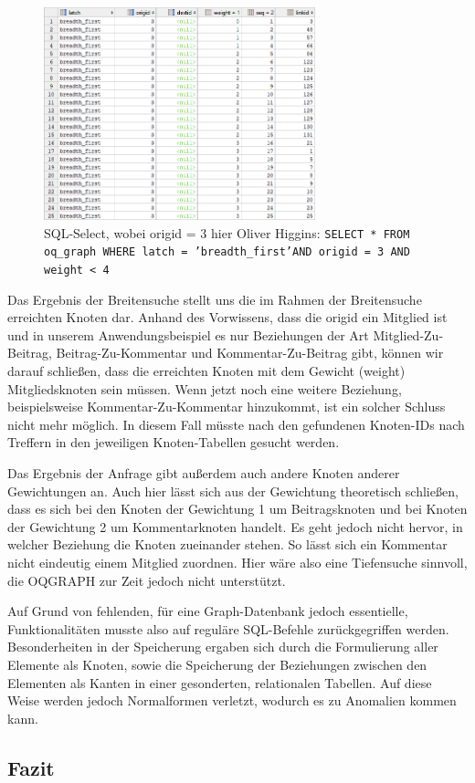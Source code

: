 \begin{figure}
	\caption{SQL-Select, wobei origid = 3 hier Oliver Higgins: \newline
		\texttt{SELECT * FROM oq\_graph WHERE latch = 'breadth\_first'\newline AND origid = 3 AND weight < 4}
	}
	\centering
	\includegraphics[width=0.7\textwidth]{images/oqgraph-select.png}
\end{figure}

Das Ergebnis der Breitensuche stellt uns die im Rahmen der Breitensuche erreichten Knoten dar. Anhand des Vorwissens, dass die origid ein Mitglied ist und in unserem Anwendungsbeispiel es nur Beziehungen der Art Mitglied-Zu-Beitrag, Beitrag-Zu-Kommentar und Kommentar-Zu-Beitrag gibt, können wir darauf schließen, dass die erreichten Knoten mit dem Gewicht (weight) Mitgliedsknoten sein müssen. Wenn jetzt noch eine weitere Beziehung, beispielsweise \grqq Kommentar-Zu-Kommentar\grqq{} hinzukommt, ist ein solcher Schluss nicht mehr möglich. In diesem Fall müsste nach den gefundenen Knoten-IDs nach Treffern in den jeweiligen Knoten-Tabellen gesucht werden.

Das Ergebnis der Anfrage gibt außerdem auch andere Knoten anderer Gewichtungen an. Auch hier lässt sich aus der Gewichtung theoretisch schließen, dass es sich bei den Knoten der Gewichtung 1 um Beitragsknoten und bei Knoten der Gewichtung 2 um Kommentarknoten handelt. Es geht jedoch nicht hervor, in welcher Beziehung die Knoten zueinander stehen. So lässt sich ein Kommentar nicht eindeutig einem Mitglied zuordnen. Hier wäre also eine Tiefensuche sinnvoll, die OQGRAPH zur Zeit jedoch nicht unterstützt.

Auf Grund von fehlenden, für eine Graph-Datenbank jedoch essentielle, Funktionalitäten musste also auf reguläre SQL-Befehle zurückgegriffen werden. Besonderheiten in der Speicherung ergaben sich durch die Formulierung aller Elemente als Knoten, sowie die Speicherung der Beziehungen zwischen den Elementen als Kanten in einer gesonderten, relationalen Tabellen. Auf diese Weise werden jedoch Normalformen verletzt, wodurch es zu Anomalien kommen kann.

\subsection{Fazit}

